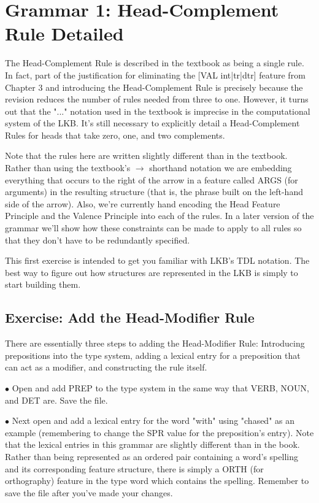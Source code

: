 
\section{Grammar 1: Head-Complement Rule Detailed}

The Head-Complement Rule is described in the textbook as being a single rule. In fact, part of the justification for eliminating the [VAL int|tr|dtr] feature from Chapter 3 and introducing the Head-Complement Rule is precisely because the revision reduces the number of rules needed from three to one.  However, it turns out that the "..." notation used in the textbook is imprecise in the computational system of the LKB.  It's still necessary to explicitly detail a Head-Complement Rules for heads that take zero, one, and two complements.

Note that the rules here are written slightly different than in the textbook.  Rather than using the textbook's $\rightarrow$ shorthand notation we are embedding everything that occurs to the right of the arrow in a feature called ARGS (for arguments) in the resulting structure (that is, the phrase built on the left-hand side of the arrow).  Also, we're currently hand encoding the Head Feature Principle and the Valence Principle into each of the rules.  In a later version of the grammar we'll show how these constraints can be made to apply to all rules so that they don't have to be redundantly specified. 

This first exercise is intended to get you familiar with LKB's TDL notation.  The best way to figure out how structures are represented in the LKB is simply to start building them.



\subsection{Exercise: Add the Head-Modifier Rule}

There are essentially three steps to adding the Head-Modifier Rule: Introducing prepositions into the type system, adding a lexical entry for a preposition that can act as a modifier, and constructing the rule itself.

$\bullet$ Open  and add PREP to the type system in the same way that VERB, NOUN, and DET are.  Save the file.

$\bullet$ Next open  and add a lexical entry for the word "with" using "chased" as an example (remembering to change the SPR value for the preposition's entry).  Note that the lexical entries in this grammar are slightly different than in the book.  Rather than being represented as an ordered pair containing a word's spelling and its corresponding feature structure, there is simply a ORTH (for orthography) feature in the type word which contains the spelling.  Remember to save the file after you've made your changes.

